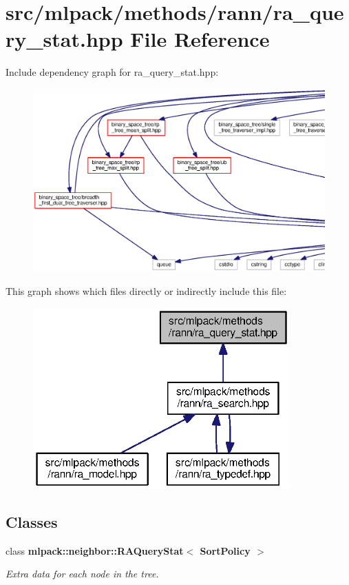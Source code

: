 \section{src/mlpack/methods/rann/ra\+\_\+query\+\_\+stat.hpp File Reference}
\label{ra__query__stat_8hpp}
Include dependency graph for ra\+\_\+query\+\_\+stat.\+hpp\+:
\nopagebreak
\begin{figure}[H]
\begin{center}
\leavevmode
\includegraphics[width=350pt]{ra__query__stat_8hpp__incl}
\end{center}
\end{figure}
This graph shows which files directly or indirectly include this file\+:
\nopagebreak
\begin{figure}[H]
\begin{center}
\leavevmode
\includegraphics[width=280pt]{ra__query__stat_8hpp__dep__incl}
\end{center}
\end{figure}
\subsection*{Classes}
\begin{DoxyCompactItemize}
\item 
class {\bf mlpack\+::neighbor\+::\+R\+A\+Query\+Stat$<$ Sort\+Policy $>$}
\begin{DoxyCompactList}\small\item\em Extra data for each node in the tree. \end{DoxyCompactList}\end{DoxyCompactItemize}
